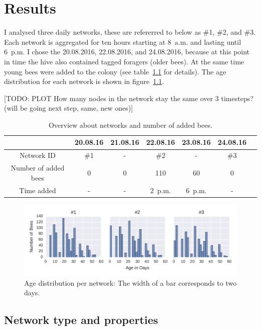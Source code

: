 \chapter{Results}

I analysed three daily networks, these are refererred to below as \#1, \#2, and \#3. Each network is aggregated for ten hours starting at 8~a.m. and lasting until 6~p.m. I chose the 20.08.2016, 22.08.2016, and 24.08.2016, because at this point in time the hive also contained tagged foragers (older bees). At the same time young bees were added to the colony (see table~\ref{tab:networks} for details). The age distribution for each network is shown in figure~\ref{fig:ages}.

[TODO: PLOT How many nodes in the network stay the same over 3 timesteps? (will be going next step, same, new ones)]

\begin{table}
\centering
\begin{tabular}{ccccccc}
\toprule
{} & 20.08.16 & 21.08.16 & 22.08.16 & 23.08.16 & 24.08.16 \\
\midrule
Network ID & \#1 & - & \#2 & - & \#3 & \\
Number of added bees & 0 & 0 & 110 & 60 & 0 \\
Time added & - & - & 2~p.m. & 6~p.m. & - \\
\bottomrule
\end{tabular}
\caption[TODO]{Overview about networks and number of added bees.}
\label{tab:networks}
\end{table}

\begin{figure}[htb]
	\centering
	\includegraphics[width=1.0\textwidth]{Figures/ages}
	\caption[Age distribution per network]{Age distribution per network: The width of a bar corresponds to two days.}
	\label{fig:ages}
\end{figure}

\section{Network type and properties}
 
